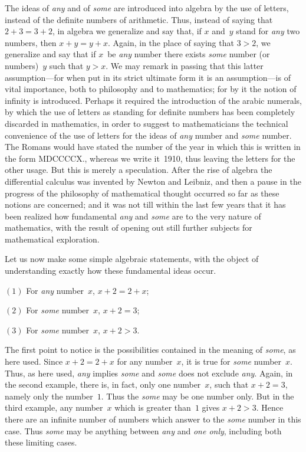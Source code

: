 \documentclass[12pt,leqno]{book}[2005/09/16]
\newcommand{\Typo}[2]{#2}
\newcommand{\PageSep}[1]{\ignorespaces}
\newcommand{\Eq}[1]{\ensuremath{#1}}
\begin{document}
The ideas of \emph{any} and of \emph{some} are introduced
into algebra by the use of letters, instead
of the definite numbers of arithmetic.
Thus, instead of saying that $2 + 3 = 3 + 2$, in
algebra we generalize and say that, if $x$ and~$y$
stand for \emph{any} two numbers, then $x + y = y + x$.
Again, in the place of saying that $3 > 2$, we
generalize and say that if $x$~be \emph{any} number
there exists \emph{some} number (or numbers)~$y$ such
that $y > x$. We may remark in passing that
this latter assumption---for when put in its
strict ultimate form it is an assumption---is
\PageSep{16}
of vital importance, both to philosophy and
to mathematics; for by it the notion of infinity
is introduced. Perhaps it required the
introduction of the arabic numerals, by which
the use of letters as standing for definite
numbers has been completely discarded in
mathematics, in order to suggest to mathematicians
the technical convenience of the
use of letters for the ideas of \emph{any} number
and \emph{some} number. The Romans would have
stated the number of the year in which this
is written in the form MDCCCCX., whereas
we write it~1910, thus leaving the letters for
the other usage. But this is merely a speculation.
After the rise of algebra the differential
calculus was invented by Newton and
%
Leibniz, and then a pause in the progress
%
of the philosophy of mathematical thought
occurred so far as these notions are concerned;
and it was not till within the last few years
that it has been realized how fundamental
\emph{any} and \emph{some} are to the very nature of mathematics,
with the result of opening out still
further subjects for mathematical exploration.

Let us now make some simple algebraic
statements, with the object of understanding
exactly how these fundamental ideas occur.

\Eq{(1)} For \emph{any} number~$x$, $x + 2 = 2 + x$;

\Eq{(2)} For \emph{some} number~$x$, $x + 2 = 3$;

\Eq{(3)} For \emph{some} number~$x$, $x + 2 > 3$.
\PageSep{17}

The first point to notice is the possibilities
contained in the meaning of \emph{some}, as here
used. Since $x + 2 = 2 + x$ for any number~$x$, it
is true for \emph{some} number~$x$. Thus, as here used,
\emph{any} implies \emph{some} and \emph{some} does not exclude
\emph{any}. Again, in the second example, there is,
in fact, only one number~$x$, such that $x + 2 = 3$,
namely only the number~$1$. Thus the \emph{some}
may be one number only. But in the third\Typo{,}{}
example, any number~$x$ which is greater than~$1$
gives $x + 2 > 3$. Hence there are an infinite
number of numbers which answer to the \emph{some}
number in this case. Thus \emph{some} may be anything
between \emph{any} and \emph{one only}, including
both these limiting cases.
\end{document}
